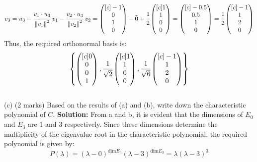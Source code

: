 \documentclass{article}
\DeclarePairedDelimiter\norm{\lVert}{\rVert}
\newcommand\norm[1]{\left\lVert#1\right\rVert}
\begin{document}
$$v_3 = u_3 - \cfrac{v_1 \cdot u_3}{\norm{v_1}^2} \; v_1 - \cfrac{v_2 \cdot u_3}{\norm{v_2}^2} \; v_2 = \begin{pmatrix}[c] -1 \\ 0 \\ 1 \\ 0 \end{pmatrix} - \Tilde{0} + \cfrac{1}{2} \begin{pmatrix}[c] 1 \\ 1 \\ 0 \\ 0 \end{pmatrix} = \begin{pmatrix}[c] -0.5 \\ 0.5 \\ 1 \\ 0 \end{pmatrix}  = \cfrac{1}{2} \begin{pmatrix}[c] -1 \\ 1 \\ 2 \\ 0 \end{pmatrix}$$
Thus, the required orthonormal basis is:
$$\left\{ \begin{pmatrix}[c] 0 \\ 0 \\ 0 \\ 1 \end{pmatrix}, \cfrac{1}{\sqrt{2}}\begin{pmatrix}[c] 1 \\ 1 \\ 0 \\ 0 \end{pmatrix}, \cfrac{1}{\sqrt{6}}\begin{pmatrix}[c] -1 \\ 1 \\ 2 \\ 0 \end{pmatrix} \right\}$$
\newline
\\ (c) (2 marks)  Based on the results of (a) and (b), write down the characteristic polynomial of $C$.
\newline
\textbf{Solution:}
From a and b, it is evident that the dimensions of $E_0$ and $E_3$ are 1 and 3 respectively. Since these dimensions determine the multiplicity of the eigenvalue root in the characteristic polynomial, the required polynomial is given by:
$$P(\lambda) = (\lambda - 0)^{\text{dim}E_0} (\lambda - 3)^{\text{dim}E_3} = \lambda (\lambda - 3)^3$$
\end{document}
